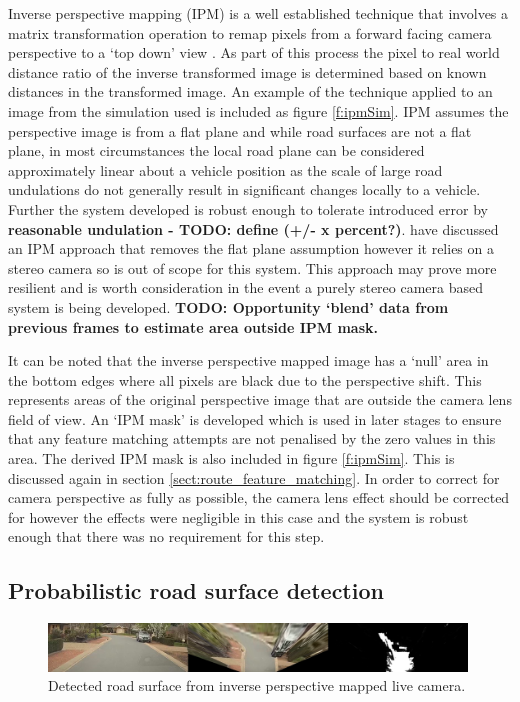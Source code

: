 \documentclass[]{aiaa-tc}%
\begin{document}
Inverse perspective mapping (IPM) is a well established technique that involves a matrix transformation operation to remap pixels from a forward facing camera perspective to a `top down' view \citep{compVisionTextbook}. As part of this process the pixel to real world distance ratio of the inverse transformed image is determined based on known distances in the transformed image. An example of the technique applied to an image from the simulation used is included as figure \ref{f:ipmSim}. IPM assumes the perspective image is from a flat plane \citep{ipmForLaneTracking} and while road surfaces are not a flat plane, in most circumstances the local road plane can be considered approximately linear about a vehicle position as the scale of large road undulations do not generally result in significant changes locally to a vehicle. Further the system developed is robust enough to tolerate introduced error by \textbf{reasonable undulation - TODO: define (+/- x percent?)}. \citet{extendedIPM} have discussed an IPM approach that removes the flat plane assumption however it relies on a stereo camera so is out of scope for this system. This approach may prove more resilient and is worth consideration in the event a purely stereo camera based system is being developed. \textbf{TODO: Opportunity `blend' data from previous frames to estimate area outside IPM mask.}


It can be noted that the inverse perspective mapped image has a `null' area in the bottom edges where all pixels are black due to the perspective shift. This represents areas of the original perspective image that are outside the camera lens field of view. An `IPM mask' is developed which is used in later stages to ensure that any feature matching attempts are not penalised by the zero values in this area. The derived IPM mask is also included in figure \ref{f:ipmSim}. This is discussed again in section \ref{sect:route_feature_matching}. In order to correct for camera perspective as fully as possible, the camera lens effect should be corrected for \citep{fisheyeEffect} however the effects were negligible in this case and the system is robust enough that there was no requirement for this step.

\subsection{Probabilistic road surface detection}\label{s:histogramRoadDetection}

\begin{figure}
	\includegraphics[width=0.99\textwidth]{RoadDetection/histRoadLive.png}
	\caption{Detected road surface from inverse perspective mapped live camera.}
	\label{f:histRoadLive}
\end{figure}
\end{document}
